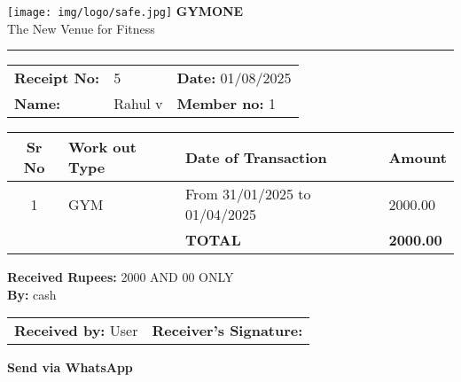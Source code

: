 \documentclass[a4paper,12pt]{article}
\begin{document}
\begin{center}
    \texttt{[image: img/logo/safe.jpg]}
    \vspace{10pt}
    {\Large \textbf{GYMONE}} \\
    {\small The New Venue for Fitness} \\
    \vspace{10pt}
    \hrule
    \vspace{10pt}
\end{center}

\begin{tabular}{p{3cm} p{6cm} p{3cm}}
    \textbf{Receipt No:} & 5 & \textbf{Date:} 01/08/2025 \\
    \textbf{Name:} & Rahul v & \textbf{Member no:} 1 \\
\end{tabular}

\vspace{10pt}

\begin{tabular}{|c|p{4cm}|p{4cm}|p{3cm}|}
    \hline
    \textbf{Sr No} & \textbf{Work out Type} & \textbf{Date of Transaction} & \textbf{Amount} \\
    \hline
    1 & GYM & From 31/01/2025 to 01/04/2025 & 2000.00 \\
    \hline
    & & \textbf{TOTAL} & \textbf{2000.00} \\
    \hline
\end{tabular}

\vspace{10pt}

\textbf{Received Rupees:} 2000 AND 00 ONLY \\
\textbf{By:} cash

\vspace{20pt}

\begin{tabular}{p{6cm} p{6cm}}
    \textbf{Received by:} \underline{\hspace{4cm}} User & \textbf{Receiver's Signature:} \underline{\hspace{4cm}} \\
\end{tabular}

\vspace{10pt}
\begin{center}
    \textbf{Send via WhatsApp}
\end{center}
\end{document}

